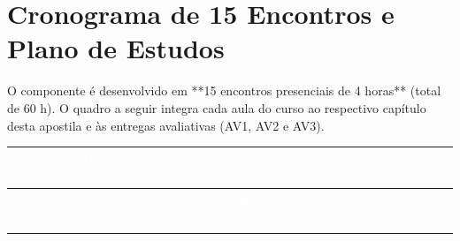 \clearpage
{}
{}
\chapter*{Cronograma de 15 Encontros e Plano de Estudos}

O componente é desenvolvido em **15 encontros presenciais de 4 horas** (total de 60 h). O quadro a seguir integra cada aula do curso ao respectivo capítulo desta apostila e às entregas avaliativas (AV1, AV2 e AV3).

\renewcommand{\arraystretch}{1.22}
\small
\begin{longtable}{@{}c p{2.8cm} p{5.7cm} p{4.3cm}@{}}
  \toprule
  \rowcolor{etIndigo}
  \textcolor{white}{\bfseries Encontro} & \textcolor{white}{\bfseries Unidade / Cap.} & \textcolor{white}{\bfseries Tema Central da Aula} & \textcolor{white}{\bfseries Autores-Chave e Avaliação} \\
  \midrule
  \endfirsthead
  \toprule
  \rowcolor{etIndigo}
  \textcolor{white}{\bfseries Encontro} & \textcolor{white}{\bfseries Unidade / Cap.} & \textcolor{white}{\bfseries Tema Central da Aula} & \textcolor{white}{\bfseries Autores-Chave e Avaliação} \\
  \midrule
  \endhead
  \bottomrule
  \endfoot


\end{longtable}
